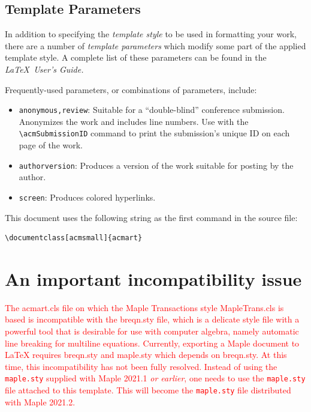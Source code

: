 \documentclass[anonymous,review,acmsmall,screen]{MapleTrans}
\begin{document}
\subsection{Template Parameters}

In addition to specifying the {\itshape template style} to be used in
formatting your work, there are a number of {\itshape template parameters}
which modify some part of the applied template style. A complete list
of these parameters can be found in the {\itshape \LaTeX\ User's Guide.}

Frequently-used parameters, or combinations of parameters, include:
\begin{itemize}
\item {\verb|anonymous,review|}: Suitable for a ``double-blind''
  conference submission. Anonymizes the work and includes line
  numbers. Use with the \verb|\acmSubmissionID| command to print the
  submission's unique ID on each page of the work.
\item{\verb|authorversion|}: Produces a version of the work suitable
  for posting by the author.
\item{\verb|screen|}: Produces colored hyperlinks.
\end{itemize}

This document uses the following string as the first command in the
source file:
\begin{verbatim}
\documentclass[acmsmall]{acmart}
\end{verbatim}

\section{An important incompatibility issue}
\textcolor{red}{The acmart.cls file on which the Maple Transactions style MapleTrans.cls is based is incompatible with the breqn.sty file, which is a delicate style file with a powerful tool that is desirable for use with computer algebra, namely automatic line breaking for multiline equations.
Currently, exporting a Maple document to LaTeX requires breqn.sty and maple.sty which depends on breqn.sty.
At this time, this incompatibility has not been fully resolved.  Instead of using the \texttt{maple.sty} supplied with Maple 2021.1 \emph{or earlier}, one needs to use the \texttt{maple.sty} file attached to this template.  This will become the \texttt{maple.sty} file distributed with Maple 2021.2.}
\end{document}
